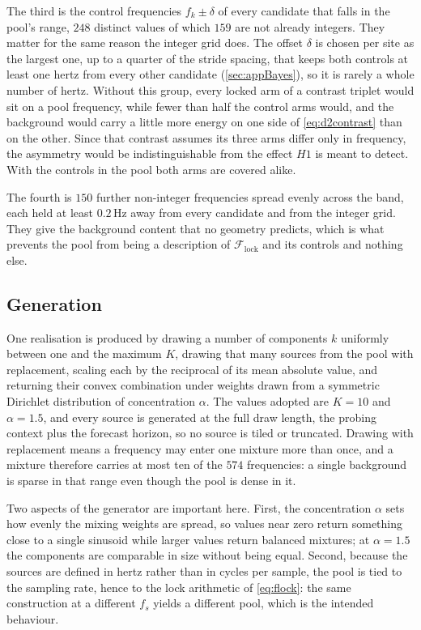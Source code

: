The third is the control frequencies $f_k\pm\delta$ of every candidate that falls in the pool's range, $248$ distinct values of which $159$ are not already integers. They matter for the same reason the integer grid does. The offset $\delta$ is chosen per site as the largest one, up to a quarter of the stride spacing, that keeps both controls at least one hertz from every other candidate (\autoref{sec:appBayes}), so it is rarely a whole number of hertz. Without this group, every locked arm of a contrast triplet would sit on a pool frequency, while fewer than half the control arms would, and the background would carry a little more energy on one side of \autoref{eq:d2contrast} than on the other. Since that contrast assumes its three arms differ only in frequency, the asymmetry would be indistinguishable from the effect $H1$ is meant to detect. With the controls in the pool both arms are covered alike.

The fourth is $150$ further non-integer frequencies spread evenly across the band, each held at least $0.2$\,Hz away from every candidate and from the integer grid. They give the background content that no geometry predicts, which is what prevents the pool from being a description of $\mathcal F_{\mathrm{lock}}$ and its controls and nothing else.

\subsection{Generation}

One realisation is produced by drawing a number of components $k$ uniformly between one and the maximum $K$, drawing that many sources from the pool with replacement, scaling each by the reciprocal of its mean absolute value, and returning their convex combination under weights drawn from a symmetric Dirichlet distribution of concentration $\alpha$. The values adopted are $K=10$ and $\alpha=1.5$, and every source is generated at the full draw length, the probing context plus the forecast horizon, so no source is tiled or truncated. Drawing with replacement means a frequency may enter one mixture more than once, and a mixture therefore carries at most ten of the $574$ frequencies: a single background is sparse in that range even though the pool is dense in it.

Two aspects of the generator are important here. First, the concentration $\alpha$ sets how evenly the mixing weights are spread, so values near zero return something close to a single sinusoid while larger values return balanced mixtures; at $\alpha=1.5$ the components are comparable in size without being equal. Second, because the sources are defined in hertz rather than in cycles per sample, the pool is tied to the sampling rate, hence to the lock arithmetic of \autoref{eq:flock}: the same construction at a different $f_s$ yields a different pool, which is the intended behaviour.

